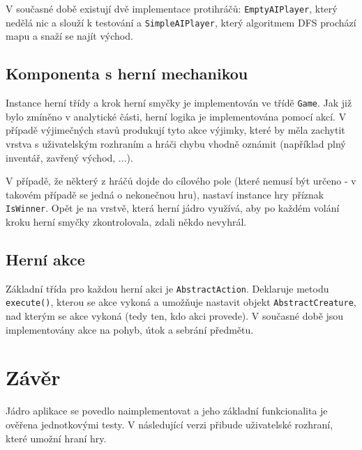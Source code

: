 \documentclass[11pt,a4paper]{scrartcl}
\begin{document}
	V současné době existují dvě implementace protihráčů: \verb|EmptyAIPlayer|, který nedělá nic a slouží k testování a \verb|SimpleAIPlayer|, který algoritmem DFS prochází mapu a snaží se najít východ. 
	
	\subsection{Komponenta s herní mechanikou}
	Instance herní třídy a krok herní smyčky je implementován ve třídě \verb|Game|. Jak již bylo zmíněno v analytické části, herní logika je implementována pomocí akcí. V případě výjimečných stavů produkují tyto akce výjimky, které by měla zachytit vrstva s uživatelským rozhraním a hráči chybu vhodně oznámit (například plný inventář, zavřený východ, ...).
	
	V případě, že některý z hráčů dojde do cílového pole (které nemusí být určeno - v takovém případě se jedná o nekonečnou hru), nastaví instance hry příznak \verb|IsWinner|. Opět je na vrstvě, která herní jádro využívá, aby po každém volání kroku herní smyčky zkontrolovala, zdali někdo nevyhrál.
	
	\subsection{Herní akce}
	Základní třída pro každou herní akci je \verb|AbstractAction|. Deklaruje metodu \verb|execute()|, kterou se akce vykoná a umožňuje nastavit objekt \verb|AbstractCreature|, nad kterým se akce vykoná (tedy ten, kdo akci provede). V současné době jsou implementovány akce na pohyb, útok a sebrání předmětu.
	 
	\section{Závěr}
	Jádro aplikace se povedlo naimplementovat a jeho základní funkcionalita je ověřena jednotkovými testy. V následující verzi přibude uživatelské rozhraní, které umožní hraní hry.
	
\end{document}
